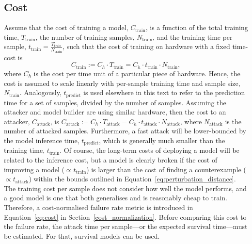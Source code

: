 \subsection{Cost}
\label{cost}

Assume that the cost of training a model, $C_{\mathrm{train}}$, is a function of the total training time, $T_{\mathrm{train}}$, the number of training samples, $N_{\mathrm{train}}$, and the training time per sample, $t_{\mathrm{train}} = \frac{T_{\mathrm{train}}}{N_{\mathrm{train}}}$, such that the cost of training on hardware with a fixed time-cost is
\begin{equation}
    C_{\mathrm{train}} := C_{h} \cdot T_{\mathrm{train}} = C_h \cdot t_{\mathrm{train}} \cdot N_{\mathrm{train}},
    \label{eq:naive_cost}
\end{equation}
where $C_h$ is the cost per time unit of a particular piece of hardware.
Hence, the cost is assumed to scale linearly with per-sample training time and sample size, $N_{\mathrm{train}}$.
Analogously, $t_{\mathrm{predict}}$ is used elsewhere in this text to refer to the prediction time for a set of samples, divided by the number of samples.
Assuming the attacker and model builder are using similar hardware, then the cost to an attacker, $C_{\mathrm{attack}}$, is $C_{\mathrm{attack}} := C_{h} \cdot T_{\mathrm{attack}} = C_h \cdot t_{\mathrm{attack}} \cdot N_{\mathrm{attack}}$, where $ N_{\mathrm{attack}} $ is the number of attacked samples. Furthermore, a fast attack will be lower-bounded by the model inference time, $ t_{\mathrm{predict}} $, which is generally much smaller than the training time, $ t_{\mathrm{train}} $. Of course, the long-term costs of deploying a model will be related to the inference cost, but a model is clearly broken if the cost of improving a model ($\propto t_{\mathrm{train}}$) is larger than the cost of finding a counterexample ($\propto t_{\mathrm{attack}}$) within the bounds outlined in Equation~\ref{eq:perturbation_distance}.
The training cost per sample does not consider how well the model performs, and a good model is one that both generalises and is reasonably cheap to train.
Therefore, a cost-normalised failure rate metric is introduced in Equation~\ref{eq:cost} in Section~\ref{cost_normalization}. Before comparing this cost to the failure rate, the attack time per sample---or the expected survival time---must be estimated.
For that, survival models can be used.
